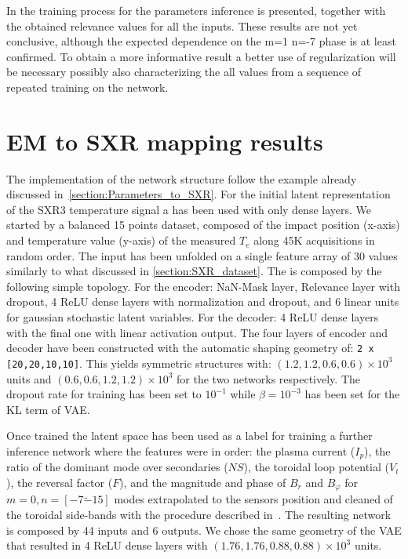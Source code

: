 %
In \Figure{\ref{fig:step_12_7_relevance}} the training process for the parameters inference is presented, together with the obtained relevance values for all the inputs.
These results are not yet conclusive, although the expected dependence on the m=1 n=-7 phase is at least confirmed.
To obtain a more informative result a better use of regularization will be necessary possibly also characterizing the all values from a sequence of repeated training on the network.

\section{EM to SXR mapping results}

The implementation of the network structure follow the example already discussed in~\cref{section:Parameters_to_SXR}.
For the initial latent representation of the SXR3 temperature signal a  has been used with only dense layers. We started by a balanced 15 points dataset, composed of the impact position (x-axis) and temperature value (y-axis) of the measured $T_e$ along 45K acquisitions in random order. The input has been unfolded on a single feature array of 30 values similarly to what discussed in \cref{section:SXR_dataset}. The  is composed by the following simple topology. For the encoder: NaN-Mask layer, Relevance layer with dropout, 4 ReLU dense layers with normalization and dropout, and 6 linear units for gaussian stochastic latent variables. For the decoder: 4 ReLU dense layers with the final one with linear activation output. The four layers of encoder and decoder have been constructed with the automatic shaping geometry of: \texttt{2 x [20,20,10,10]}. This yields symmetric structures with: $(1.2, 1.2, 0.6, 0.6) \times 10^3$ units and $(0.6, 0.6, 1.2, 1.2) \times 10^3$ for the two networks respectively.
The dropout rate for training has been set to $10^{-1}$ while $\beta=10^{-3}$ has been set for the KL term of VAE.

Once trained the  latent space has been used as a label for training a further inference network where the features were in order: the plasma current ($I_p$), the ratio of the dominant mode over secondaries ($NS$), the toroidal loop potential ($V_t$), the reversal factor ($F$), and the magnitude and phase of $B_r$ and $B_\varphi$ for $m=0, n=[-7 \tilde -15]$ modes extrapolated to the sensors position and cleaned of the toroidal side-bands with the procedure described in~\cite{Zanca_2004}.
The resulting network is composed by 44 inputs and 6 outputs. We chose the same geometry of the VAE that resulted in 4 ReLU dense layers with $(1.76, 1.76, 0.88, 0.88) \times 10^3$ units. 


